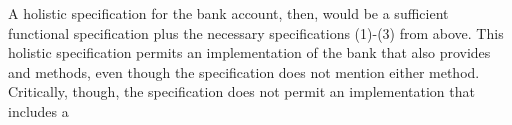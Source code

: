 A  holistic  specification for the bank account, then,
would be a sufficient functional specification
plus the necessary
specifications (1)-(3) from above. %
This holistic specification
permits an implementation of the bank that also provides  
and  methods, even though the specification does not mention either method.
Critically, though, the \Chainmail specification
does not permit an
implementation that includes a  

 
%
